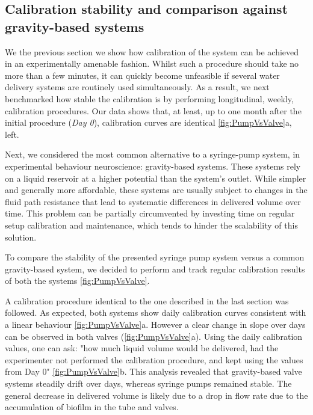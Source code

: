 \subsection*{Calibration stability and comparison against gravity-based systems}

We the previous section we show how calibration of the system can be achieved in an experimentally amenable fashion. Whilst such a procedure should take no more than a few minutes, it can quickly become unfeasible if several water delivery systems are routinely used simultaneously. As a result, we next benchmarked how stable the calibration is by performing longitudinal, weekly, calibration procedures. Our data shows that, at least, up to one month after the initial procedure (\textit{Day 0}), calibration curves are identical \ref{fig:PumpVsValve}a, left.

Next, we considered the most common alternative to a syringe-pump system, in experimental behaviour neuroscience: gravity-based systems. These systems rely on a liquid reservoir at a higher potential than the system's outlet. While simpler and generally more affordable, these systems are usually subject to changes in the fluid path resistance that lead to systematic differences in delivered volume over time. This problem can be partially circumvented by investing time on regular setup calibration and maintenance, which tends to hinder the scalability of this solution.

To compare the stability of the presented syringe pump system versus a common gravity-based system, we decided to perform and track regular calibration results of both the systems \cref{fig:PumpVsValve}.

A calibration procedure identical to the one described in the last section was followed. As expected, both systems show daily calibration curves consistent with a linear behaviour \cref{fig:PumpVsValve}a. However a clear change in slope over days can be observed in both valves (\cref{fig:PumpVsValve}a). Using the daily calibration values, one can ask: "how much liquid volume would be delivered, had the experimenter not performed the calibration procedure, and kept using the values from Day 0" \cref{fig:PumpVsValve}b. This analysis revealed that gravity-based valve systems steadily drift over days, whereas syringe pumps remained stable. The general decrease in delivered volume is likely due to a drop in flow rate due to the accumulation of biofilm in the tube and valves. 


